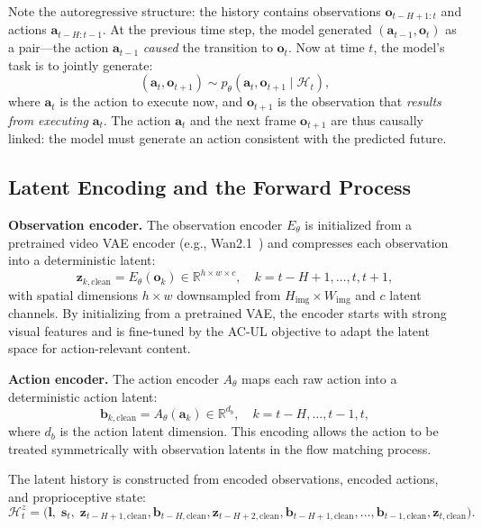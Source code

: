 \documentclass{article}
\newcommand{\vo}{\bm{o}}
\newcommand{\vz}{\bm{z}}
\newcommand{\va}{\bm{a}}
\newcommand{\vb}{\bm{b}}
\newcommand{\R}{\mathbb{R}}
\begin{document}
Note the autoregressive structure: the history contains observations $\vo_{t-H+1:t}$ and actions $\va_{t-H:t-1}$. At the previous time step, the model generated $(\va_{t-1}, \vo_t)$ as a pair---the action $\va_{t-1}$ \emph{caused} the transition to $\vo_t$. Now at time $t$, the model's task is to jointly generate:
\begin{equation}
  (\va_t, \vo_{t+1}) \sim p_\theta(\va_t, \vo_{t+1} \mid \mathcal{H}_t),
  \label{eq:joint_gen}
\end{equation}
where $\va_t$ is the action to execute now, and $\vo_{t+1}$ is the observation that \emph{results from executing} $\va_t$. The action $\va_t$ and the next frame $\vo_{t+1}$ are thus causally linked: the model must generate an action consistent with the predicted future.

\subsection{Latent Encoding and the Forward Process}
\label{sec:encoding}

\textbf{Observation encoder.}
The observation encoder $E_\theta$ is initialized from a pretrained video VAE encoder (e.g., Wan2.1~\citep{wan2025}) and compresses each observation into a deterministic latent:
\begin{equation}
  \vz_{k,\text{clean}} = E_\theta(\vo_k) \in \R^{h \times w \times c}, \quad k = t-H+1, \ldots, t, t+1,
  \label{eq:encode}
\end{equation}
with spatial dimensions $h \times w$ downsampled from $H_{\text{img}} \times W_{\text{img}}$ and $c$ latent channels.
By initializing from a pretrained VAE, the encoder starts with strong visual features and is fine-tuned by the AC-UL objective to adapt the latent space for action-relevant content.

\textbf{Action encoder.}
The action encoder $A_\theta$ maps each raw action into a deterministic action latent:
\begin{equation}
  \vb_{k,\text{clean}} = A_\theta(\va_k) \in \R^{d_b}, \quad k = t-H, \ldots, t-1, t,
  \label{eq:action_encode}
\end{equation}
where $d_b$ is the action latent dimension. This encoding allows the action to be treated symmetrically with observation latents in the flow matching process.

The latent history is constructed from encoded observations, encoded actions, and proprioceptive state:
\begin{equation}
  \mathcal{H}_t^z = \big(\bm{l},\; \bm{s}_t,\; \vz_{t-H+1,\text{clean}}, \vb_{t-H,\text{clean}}, \vz_{t-H+2,\text{clean}}, \vb_{t-H+1,\text{clean}}, \ldots, \vb_{t-1,\text{clean}}, \vz_{t,\text{clean}}\big).
  \label{eq:latent_history}
\end{equation}
\end{document}
